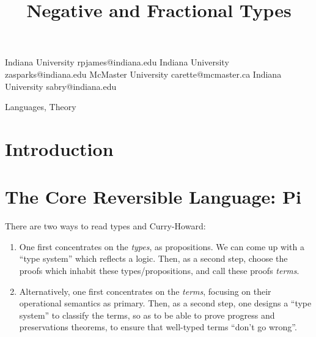 \documentclass[preprint]{sigplanconf}
\begin{document}
\CopyrightYear{}
\copyrightdata{}
\titlebanner{}
\preprintfooter{}

\title{Negative and Fractional Types} 

           {Indiana University}
           {rpjames@indiana.edu}
           {Indiana University}
           {zasparks@indiana.edu}
           {McMaster University}
           {carette@mcmaster.ca}
           {Indiana University}
           {sabry@indiana.edu}

\maketitle

\begin{abstract}

\end{abstract}


\terms
Languages, Theory

\keywords 

\section{Introduction}

\nocite{infeffects}

\section{The Core Reversible Language: {{Pi}} }
\label{sec:pi}

There are two ways to read types and Curry-Howard: 
\begin{enumerate}
\item One first concentrates on the \emph{types}, as propositions.  We can
  come up with a ``type system'' which reflects a logic.  Then, as a second
  step, choose the proofs which inhabit these types/propositions, and call
  these proofs \emph{terms}.
\item Alternatively, one first concentrates on the \emph{terms}, focusing on
  their operational semantics as primary.  Then, as a second step, one
  designs a ``type system'' to classify the terms, so as to be able to prove
  progress and preservations theorems, to ensure that well-typed terms
  ``don't go wrong''.
\end{enumerate}
\end{document}
